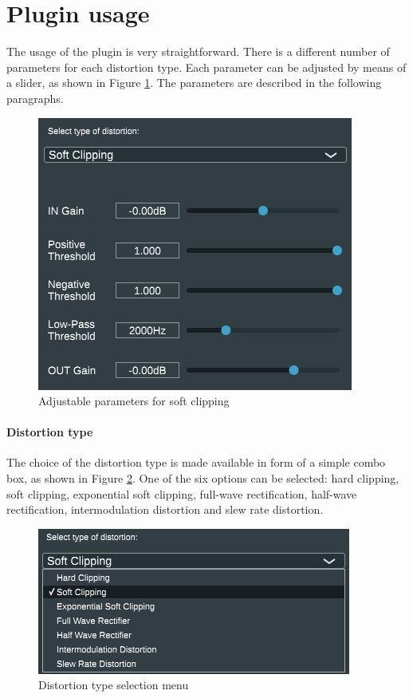 \documentclass{article}
\begin{document}
\section{Plugin usage}
The usage of the plugin is very straightforward. There is a different number of parameters for each distortion type. Each parameter can be adjusted by means of a slider, as shown in Figure \ref{fig:parameters_soft}. The parameters are described in the following paragraphs.
\begin{figure}[h!]
\centering
\includegraphics[scale=0.6]{images/cmlshw2_soft.png}
\caption{Adjustable parameters for soft clipping}
\label{fig:parameters_soft}
\end{figure}
\paragraph{Distortion type} The choice of the distortion type is made available in form of a simple combo box, as shown in Figure \ref{fig:dist_type_combobox}. One of the six options can be selected: hard clipping, soft clipping, exponential soft clipping, full-wave rectification, half-wave rectification, intermodulation distortion and slew rate distortion.
\begin{figure}[h!]
\centering
\includegraphics[scale=0.6]{images/cmlshw2_tendina.png}
\caption{Distortion type selection menu}
\label{fig:dist_type_combobox}
\end{figure}
\end{document}
